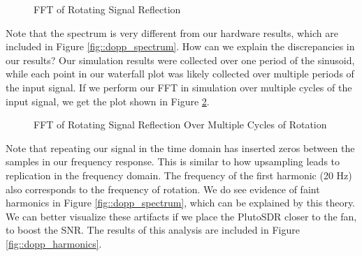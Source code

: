 \documentclass{article}
\begin{document}
\begin{figure}[H]
    	\centering
    	\caption{FFT of Rotating Signal Reflection}
    	\label{fig::freq_response}
\end{figure}

\noindent Note that the spectrum is very different from our hardware results, which are included in Figure \ref{fig::dopp_spectrum}. How can we explain the discrepancies in our results? Our simulation results were collected over one period of the sinusoid, while each point in our waterfall plot was likely collected over multiple periods of the input signal. If we perform our FFT in simulation over multiple cycles of the input signal, we get the plot shown in Figure \ref{fig::freq_response_multi_cycle}.

\begin{figure}[H]
    	\centering
    	\caption{FFT of Rotating Signal Reflection Over Multiple Cycles of Rotation}
    	\label{fig::freq_response_multi_cycle}
\end{figure}

\noindent Note that repeating our signal in the time domain has inserted zeros between the samples in our frequency response. This is similar to how upsampling leads to replication in the frequency domain. The frequency of the first harmonic (20 Hz) also corresponds to the frequency of rotation. We do see evidence of faint harmonics in Figure \ref{fig::dopp_spectrum}, which can be explained by this theory. We can better visualize these artifacts if we place the PlutoSDR closer to the fan, to boost the SNR. The results of this analysis are included in Figure \ref{fig::dopp_harmonics}.
\end{document}

